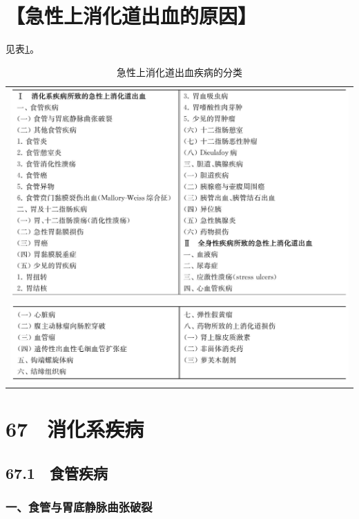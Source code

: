 \section{【急性上消化道出血的原因】}

见表\ref{tab21-1}。

\begin{longtable}{c}
 \caption{急性上消化道出血疾病的分类}
 \label{tab21-1}
 \endfirsthead
 \caption[]{急性上消化道出血疾病的分类}
 \endhead
 \includegraphics[width=\textwidth,height=\textheight,keepaspectratio]{./images/Image00121.jpg}\\
 \includegraphics[width=\textwidth,height=\textheight,keepaspectratio]{./images/Image00122.jpg}
 \end{longtable}

\protect\hypertarget{text00167.html}{}{}

\section{67　消化系疾病}

\subsection{67.1　食管疾病}

\subsubsection{一、食管与胃底静脉曲张破裂}

